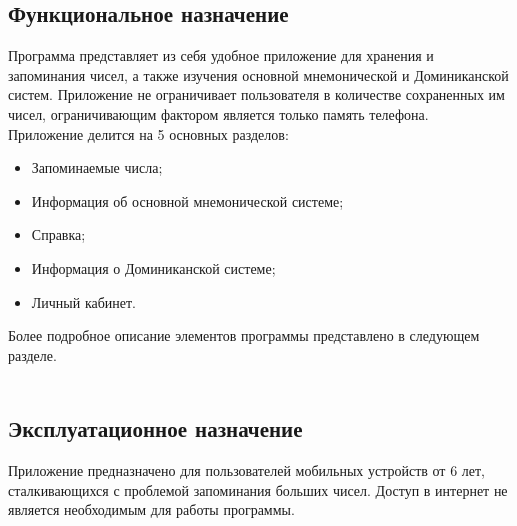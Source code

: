 \documentclass[draft]{article}
\begin{document}
\subsection{Функциональное назначение}
Программа представляет из себя удобное приложение для хранения и запоминания чисел, а также изучения основной мнемонической и Доминиканской систем. Приложение не ограничивает пользователя в количестве сохраненных им чисел, ограничивающим фактором является только память телефона.\\
Приложение делится на 5 основных разделов:
\begin{itemize}
\item Запоминаемые числа;\\
\item Информация об основной мнемонической системе;\\
\item Справка;\\
\item Информация о Доминиканской системе;\\
\item Личный кабинет.\\
\end{itemize}
Более подробное описание элементов программы представлено в следующем разделе.\\
~\\
\subsection{Эксплуатационное назначение}
Приложение предназначено для пользователей мобильных устройств от 6 лет, сталкивающихся с проблемой запоминания больших чисел. Доступ в интернет не является необходимым для работы программы.
~\\

\newpage
\end{document}
